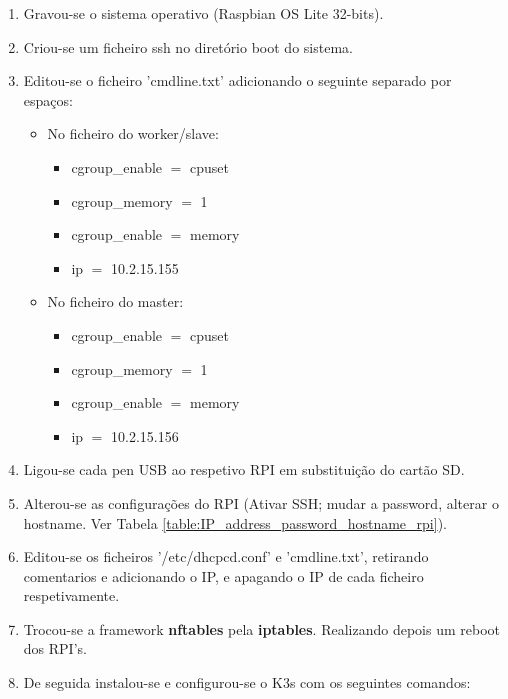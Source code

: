     \begin{enumerate}
        \item Gravou-se o sistema operativo (Raspbian OS Lite 32-bits).
        \item Criou-se um ficheiro ssh no diretório boot do sistema.
        \item Editou-se o ficheiro 'cmdline.txt' adicionando o seguinte separado por espaços:

        \begin{itemize}
            \item No ficheiro do worker/slave:

            \begin{itemize}
                \item cgroup\_enable \( = \) cpuset
                \item cgroup\_memory \( = \) 1
                \item cgroup\_enable \( = \) memory
                \item ip \( = \) 10.2.15.155
            \end{itemize}

            \item No ficheiro do master:

            \begin{itemize}
                \item cgroup\_enable \( = \) cpuset
                \item cgroup\_memory \( = \) 1
                \item cgroup\_enable \( = \) memory
                \item ip \( = \) 10.2.15.156
            \end{itemize}

        \end{itemize}

        \item Ligou-se cada pen USB ao respetivo RPI em substituição do cartão SD.
        \item Alterou-se as configurações do RPI (Ativar SSH; mudar a password, alterar o hostname. Ver Tabela \ref{table:IP_address_password_hostname_rpi}).
        \item Editou-se os ficheiros '/etc/dhcpcd.conf' e 'cmdline.txt', retirando comentarios e adicionando o IP, e apagando o IP de cada ficheiro respetivamente.
        \item Trocou-se a framework \textbf{nftables} pela \textbf{iptables}. Realizando depois um reboot dos RPI's.
        \item De seguida instalou-se e configurou-se o K3s com os seguintes comandos:


\end{enumerate}
